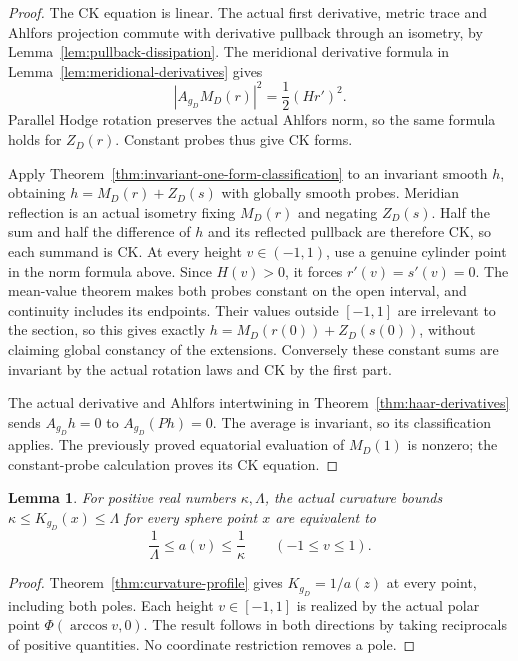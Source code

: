 \documentclass[11pt]{article}
\newtheorem{lemma}[theorem]{Lemma}
\begin{document}
\begin{proof}
The CK equation is linear. The actual first derivative, metric trace and
Ahlfors projection commute with derivative pullback through an isometry,
by Lemma~\ref{lem:pullback-dissipation}.
The meridional derivative formula in Lemma~\ref{lem:meridional-derivatives}
gives
\[
 |A_{g_D}M_D(r)|^2=\frac12(Hr')^2.
\]
Parallel Hodge rotation preserves the actual Ahlfors norm, so the same
formula holds for $Z_D(r)$. Constant probes thus give CK forms.

Apply Theorem~\ref{thm:invariant-one-form-classification} to an invariant
smooth $h$, obtaining $h=M_D(r)+Z_D(s)$ with globally smooth probes.
Meridian reflection is an actual isometry fixing $M_D(r)$ and negating
$Z_D(s)$. Half the sum and half the difference of $h$ and its reflected
pullback are therefore CK, so each summand is CK.
At every height $v\in(-1,1)$, use a genuine cylinder point in the norm
formula above. Since $H(v)>0$, it forces $r'(v)=s'(v)=0$.
The mean-value theorem makes both probes constant on the open interval,
and continuity includes its endpoints. Their values outside $[-1,1]$
are irrelevant to the section, so this gives exactly
$h=M_D(r(0))+Z_D(s(0))$, without claiming global constancy of the extensions.
Conversely these constant sums are invariant by the actual rotation laws
and CK by the first part.

The actual derivative and Ahlfors intertwining in
Theorem~\ref{thm:haar-derivatives} sends $A_{g_D}h=0$ to
$A_{g_D}(Ph)=0$. The average is invariant, so its classification applies.
The previously proved equatorial evaluation of $M_D(1)$ is nonzero;
the constant-probe calculation proves its CK equation.
\end{proof}

\begin{lemma}\label{lem:curvature-profile-box}
For positive real numbers $\kappa,\Lambda$, the actual curvature bounds
$\kappa\leq K_{g_D}(x)\leq\Lambda$ for every sphere point $x$ are equivalent to
\[
 \frac1\Lambda\leq a(v)\leq\frac1\kappa
 \qquad(-1\leq v\leq1).
\]
\end{lemma}

\begin{proof}
Theorem~\ref{thm:curvature-profile} gives $K_{g_D}=1/a(z)$ at every point,
including both poles. Each height $v\in[-1,1]$ is realized by the actual
polar point $\Phi(\arccos v,0)$. The result follows in both directions
by taking reciprocals of positive quantities. No coordinate restriction
removes a pole.
\end{proof}
\end{document}
